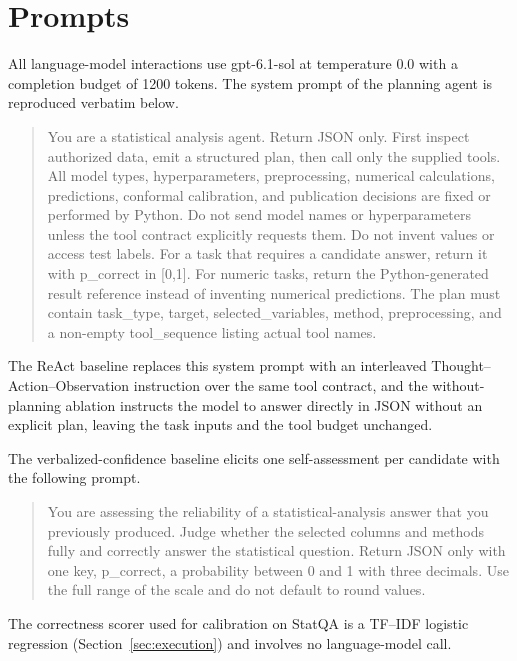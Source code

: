 \documentclass[preprint,12pt,authoryear]{elsarticle}
\begin{document}
\section{Prompts}
\label{app:prompts}

All language-model interactions use gpt-6.1-sol at temperature 0.0 with a completion budget of 1200 tokens.
The system prompt of the planning agent is reproduced verbatim below.

\begin{quote}
\small\raggedright\ttfamily
You are a statistical analysis agent. Return JSON only.
First inspect authorized data, emit a structured plan, then call only the supplied tools.
All model types, hyperparameters, preprocessing, numerical calculations, predictions, conformal calibration, and publication decisions are fixed or performed by Python.
Do not send model names or hyperparameters unless the tool contract explicitly requests them.
Do not invent values or access test labels.
For a task that requires a candidate answer, return it with p\_correct in [0,1].
For numeric tasks, return the Python-generated result reference instead of inventing numerical predictions.
The plan must contain task\_type, target, selected\_variables, method, preprocessing, and a non-empty tool\_sequence listing actual tool names.
\end{quote}

The ReAct baseline replaces this system prompt with an interleaved Thought--Action--Observation instruction over the same tool contract, and the without-planning ablation instructs the model to answer directly in JSON without an explicit plan, leaving the task inputs and the tool budget unchanged.

The verbalized-confidence baseline elicits one self-assessment per candidate with the following prompt.

\begin{quote}
\small\raggedright\ttfamily
You are assessing the reliability of a statistical-analysis answer that you previously produced.
Judge whether the selected columns and methods fully and correctly answer the statistical question.
Return JSON only with one key, p\_correct, a probability between 0 and 1 with three decimals.
Use the full range of the scale and do not default to round values.
\end{quote}

The correctness scorer used for calibration on StatQA is a TF--IDF logistic regression (Section~\ref{sec:execution}) and involves no language-model call.
\end{document}
